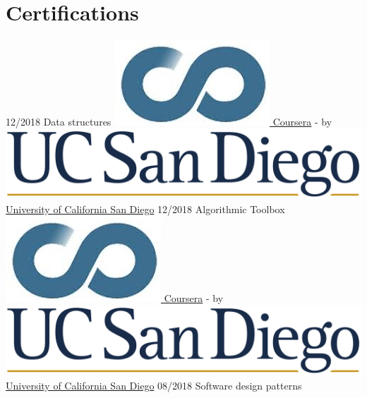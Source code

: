 \documentclass[a4paper]{friggeri-cv}
\begin{document}
    \section{Certifications}\label{sec:certifications}
    \begin{entrylist}
        \entry
        {12/2018}
        {Data structures}
        {\href{http://coursera.org/}{\includegraphics[scale=0.08]{../assets/images/logos/Coursera_logo.jpg} Coursera} - by \href{https://ucsd.edu/}{\includegraphics[scale=0.015]{../assets/images/logos/UCSD_logo.png} University of California San Diego}}
        {}
        \entry
        {12/2018}
        {Algorithmic Toolbox}
        {\href{http://coursera.org/}{\includegraphics[scale=0.08]{../assets/images/logos/Coursera_logo.jpg} Coursera} - by \href{https://ucsd.edu/}{\includegraphics[scale=0.015]{../assets/images/logos/UCSD_logo.png} University of California San Diego}}
        {}
        \entry
        {08/2018}
        {Software design patterns}

\end{entrylist}
\end{document}
